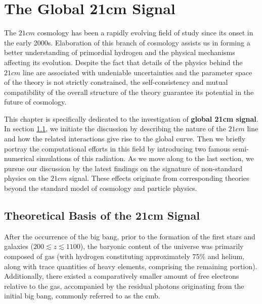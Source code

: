 \documentclass[12pt, TexShade, letterpaper]{report}
\begin{document}
\chapter{The Global 21cm Signal}
\label{chap:global21cm}
The $21cm$ cosmology has been a rapidly evolving field of study since its onset in the early 2000s. Elaboration of this branch of cosmology assists us in forming a better understanding of primordial hydrogen and the physical mechanisms affecting its evolution. Despite the fact that details of the physics behind the $21cm$ line are associated with undeniable uncertainties and the parameter space of the theory is not strictly constrained, the self-consistency and mutual compatibility of the overall structure of the theory guarantee its potential in the future of cosmology. \par
This chapter is specifically dedicated to the investigation of  \textbf{global 21cm signal}. In section \ref{chap:global21cm,sub:physics}, we initiate the discussion by describing the nature of the $21cm$ line and how the related interactions give rise to the global curve. Then we briefly portray the computational efforts in this field by introducing two famous semi-numerical simulations of this radiation.
As we move along to the last section, we pursue our discussion by the latest findings on the signature of non-standard physics on the $21cm$ signal. These effects originate from corresponding theories beyond the standard model of cosmology and particle physics.\par
\section{Theoretical Basis of the 21cm Signal}
\label{chap:global21cm,sub:physics}
After the occurrence of the big bang, prior to the formation of the first stars and galaxies ($200 \lesssim z \lesssim 1100$), the baryonic content of the universe was primarily composed of gas (with hydrogen constituting approximately 75\% and helium, along with trace quantities of heavy elements, comprising the remaining portion). Additionally, there existed a comparatively smaller amount of free electrons relative to the gas, accompanied by the residual photons originating from the initial big bang, commonly referred to as the \gls{cmb}\cite{map_universe, 21century}.
\end{document}
